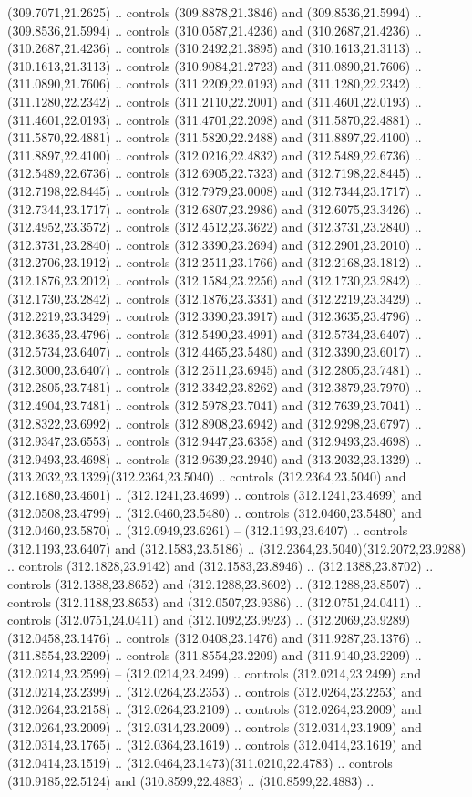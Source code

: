 (309.7071,21.2625) .. controls (309.8878,21.3846) and (309.8536,21.5994) .. (309.8536,21.5994) .. controls (310.0587,21.4236) and (310.2687,21.4236) .. (310.2687,21.4236) .. controls (310.2492,21.3895) and (310.1613,21.3113) .. (310.1613,21.3113) .. controls (310.9084,21.2723) and (311.0890,21.7606) .. (311.0890,21.7606) .. controls (311.2209,22.0193) and (311.1280,22.2342) .. (311.1280,22.2342) .. controls (311.2110,22.2001) and (311.4601,22.0193) .. (311.4601,22.0193) .. controls (311.4701,22.2098) and (311.5870,22.4881) .. (311.5870,22.4881) .. controls (311.5820,22.2488) and (311.8897,22.4100) .. (311.8897,22.4100) .. controls (312.0216,22.4832) and (312.5489,22.6736) .. (312.5489,22.6736) .. controls (312.6905,22.7323) and (312.7198,22.8445) .. (312.7198,22.8445) .. controls (312.7979,23.0008) and (312.7344,23.1717) .. (312.7344,23.1717) .. controls (312.6807,23.2986) and (312.6075,23.3426) .. (312.4952,23.3572) .. controls (312.4512,23.3622) and (312.3731,23.2840) .. (312.3731,23.2840) .. controls (312.3390,23.2694) and (312.2901,23.2010) .. (312.2706,23.1912) .. controls (312.2511,23.1766) and (312.2168,23.1812) .. (312.1876,23.2012) .. controls (312.1584,23.2256) and (312.1730,23.2842) .. (312.1730,23.2842) .. controls (312.1876,23.3331) and (312.2219,23.3429) .. (312.2219,23.3429) .. controls (312.3390,23.3917) and (312.3635,23.4796) .. (312.3635,23.4796) .. controls (312.5490,23.4991) and (312.5734,23.6407) .. (312.5734,23.6407) .. controls (312.4465,23.5480) and (312.3390,23.6017) .. (312.3000,23.6407) .. controls (312.2511,23.6945) and (312.2805,23.7481) .. (312.2805,23.7481) .. controls (312.3342,23.8262) and (312.3879,23.7970) .. (312.4904,23.7481) .. controls (312.5978,23.7041) and (312.7639,23.7041) .. (312.8322,23.6992) .. controls (312.8908,23.6942) and (312.9298,23.6797) .. (312.9347,23.6553) .. controls (312.9447,23.6358) and (312.9493,23.4698) .. (312.9493,23.4698) .. controls (312.9639,23.2940) and (313.2032,23.1329) .. (313.2032,23.1329)(312.2364,23.5040) .. controls (312.2364,23.5040) and (312.1680,23.4601) .. (312.1241,23.4699) .. controls (312.1241,23.4699) and (312.0508,23.4799) .. (312.0460,23.5480) .. controls (312.0460,23.5480) and (312.0460,23.5870) .. (312.0949,23.6261) -- (312.1193,23.6407) .. controls (312.1193,23.6407) and (312.1583,23.5186) .. (312.2364,23.5040)(312.2072,23.9288) .. controls (312.1828,23.9142) and (312.1583,23.8946) .. (312.1388,23.8702) .. controls (312.1388,23.8652) and (312.1288,23.8602) .. (312.1288,23.8507) .. controls (312.1188,23.8653) and (312.0507,23.9386) .. (312.0751,24.0411) .. controls (312.0751,24.0411) and (312.1092,23.9923) .. (312.2069,23.9289)(312.0458,23.1476) .. controls (312.0408,23.1476) and (311.9287,23.1376) .. (311.8554,23.2209) .. controls (311.8554,23.2209) and (311.9140,23.2209) .. (312.0214,23.2599) -- (312.0214,23.2499) .. controls (312.0214,23.2499) and (312.0214,23.2399) .. (312.0264,23.2353) .. controls (312.0264,23.2253) and (312.0264,23.2158) .. (312.0264,23.2109) .. controls (312.0264,23.2009) and (312.0264,23.2009) .. (312.0314,23.2009) .. controls (312.0314,23.1909) and (312.0314,23.1765) .. (312.0364,23.1619) .. controls (312.0414,23.1619) and (312.0414,23.1519) .. (312.0464,23.1473)(311.0210,22.4783) .. controls (310.9185,22.5124) and (310.8599,22.4883) .. (310.8599,22.4883) .. 